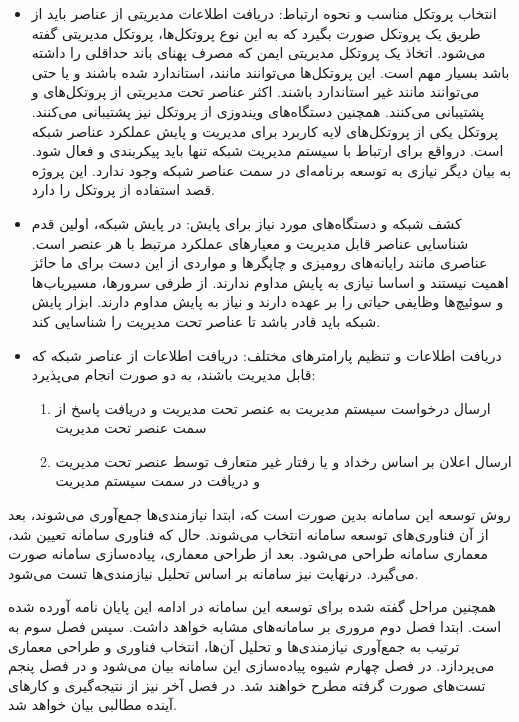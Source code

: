 \begin{itemize}
    \item انتخاب پروتکل مناسب و نحوه ارتباط: دریافت اطلاعات مدیریتی از عناصر باید از طریق یک پروتکل صورت بگیرد که به این نوع پروتکل‌ها، پروتکل مدیریتی گفته می‌شود. اتخاذ یک پروتکل مدیریتی ایمن که مصرف پهنای باند حداقلی را داشته باشد بسیار مهم است. این پروتکل‌ها می‌توانند مانند، استاندارد شده باشند و یا حتی می‌توانند مانند  غیر استاندارد باشند. اکثر عناصر تحت مدیریتی از پروتکل‌های  و   پشتیبانی می‌کنند. همچنین دستگاه‌های ویندوزی از پروتکل  نیز پشتیبانی می‌کنند. پروتکل   یکی از پروتکل‌های لایه کاربرد برای مدیریت و پایش عملکرد عناصر شبکه است. درواقع برای ارتباط با سیستم مدیریت شبکه تنها باید پیکربندی و فعال شود. به بیان دیگر نیازی به توسعه برنامه‌ای در سمت عناصر شبکه وجود ندارد. این پروژه قصد استفاده از پروتکل  را دارد.
\newpage
    \item کشف شبکه و دستگاه‌های مورد نیاز برای پایش: در پایش شبکه، اولین قدم شناسایی عناصر قابل مدیریت و معیارهای عملکرد مرتبط با هر عنصر است. عناصری مانند رایانه‌های رومیزی و چاپگرها و مواردی از این دست برای ما حائز اهمیت نیستند و اساسا نیازی به پایش مداوم ندارند. از طرفی سرورها، مسیریاب‌ها و سوئیچ‌ها وظایفی حیاتی را بر عهده دارند و نیاز به پایش مداوم دارند. ابزار پایش شبکه باید قادر باشد تا عناصر تحت مدیریت را شناسایی کند.
    \item دریافت اطلاعات و تنظیم پارامترهای مختلف: دریافت اطلاعات از عناصر شبکه که قابل مدیریت باشند، به دو صورت انجام می‌پذیرد:
    \begin{enumerate}
        \item ارسال درخواست سیستم مدیریت به عنصر تحت مدیریت و دریافت پاسخ از سمت عنصر تحت مدیریت
        \item ارسال اعلان بر اساس رخداد و یا رفتار غیر متعارف توسط عنصر تحت مدیریت و دریافت در سمت سیستم مدیریت
    \end{enumerate}
\end{itemize}


روش توسعه این سامانه بدین صورت است که، ابتدا نیازمندی‌ها جمع‌آوری می‌شوند، بعد از آن فناوری‌های توسعه سامانه انتخاب می‌شوند. حال که فناوری سامانه تعیین شد، معماری سامانه طراحی می‌شود. بعد از طراحی معماری، پیاده‌سازی سامانه صورت می‌گیرد. درنهایت نیز سامانه بر اساس تحلیل نیازمندی‌ها تست می‌شود. 

همچنین مراحل گفته شده برای توسعه این سامانه در ادامه این پایان نامه آورده شده است. ابتدا فصل دوم مروری بر سامانه‌های مشابه خواهد داشت. سپس فصل سوم به ترتیب به جمع‌آوری نیازمندی‌ها و تحلیل آن‌ها، انتخاب فناوری و طراحی معماری می‌پردازد. در فصل چهارم شیوه پیاده‌سازی این سامانه بیان می‌شود و در فصل پنجم تست‌های صورت گرفته مطرح خواهند شد. در فصل آخر نیز از نتیجه‌گیری و کارهای آینده مطالبی بیان خواهد شد.


